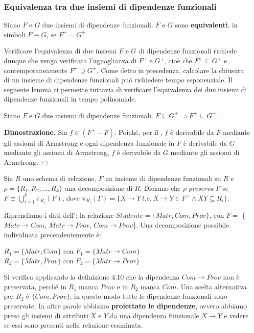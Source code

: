 \subsubsection{Equivalenza tra due insiemi di dipendenze funzionali}
\begin{defn}
Siano $F$ e $G$ due insiemi di dipendenze funzionali. $F$ e $G$ sono \textbf{equivalenti}, in simboli $F \equiv 
G$, se $F^+ = G^+$.
\end{defn}
Verificare l'equivalenza di due insiemi $F$ e $G$ di dipendenze funzionali richiede dunque che venga verificata
l'uguaglianza di $F^+$ e $G^+$, cioè che $F^+ \subseteq G^+$ e contemporaneamente $F^+ \supseteq G^+$. Come 
detto in precedenza, calcolare la chiusura di un insieme di dipendenze funzionali può richiedere tempo 
esponenziale. Il seguente lemma ci permette tuttavia di verificare l'equivalenza dei due insiemi di dipendenze
funzionali in tempo polinomiale.
\label{lemma4_2}
\begin{lem}
Siano $F$ e $G$ due insiemi di dipendenze funzionali. $F \subseteq G^+ \Rightarrow F^+ \subseteq G^+$. 
\end{lem}
\textbf{Dimostrazione.} Sia $f \in (F^+ -F)$. Poiché, per il , $f$ è derivabile
da $F$ mediante gli assiomi di Armstrong e ogni dipendenza funzionale in $F$ è derivabile da $G$ mediante gli 
assiomi di Armstrong, $f$ è derivabile da $G$ mediante gli assiomi di Armstrong. \hfill $\Box$

\begin{defn}
Sia $R$ uno schema di relazione, $F$ un insieme di dipendenze funzionali su $R$ e $\rho = \{R_1, R_2, \ldots,
R_k\}$ una decomposizione di $R$. Diciamo che $\rho$ \emph{preserva} $F$ se $F \equiv \bigcup_{i=1}^k 
\pi_{R_i}(F)$, dove $\pi_{R_i}(F) = \{X \rightarrow Y\ t.c.\ X \rightarrow Y \in F^+ \wedge XY \subseteq R_i\}$.
\end{defn}

\begin{exmp}
 Riprendiamo i dati dell': la relazione $Studente = \{Matr, Com, Prov\}$,
 con $F = $ \{$Matr\rightarrow Com$, $Matr\rightarrow Prov$, $Com\rightarrow Prov$\}. Una decomposizione possibile
 individuata precendentemente è:
  \begin{center}
    $R_1 = \{Matr, Com\}$ con $F_1 = \{Matr\rightarrow Com\}$ \\
    $R_2 = \{Matr, Prov\}$ con $F_2 = \{Matr\rightarrow Prov\}$ \\
   \end{center}
 Si verifica applicando la definizione 4.10 che la dipendenza $Com \rightarrow Prov$ non è preservata, 
 perché in $R_1$ manca $Prov$ e in $R_2$ manca $Com$. Una scelta alternativa per $R_2$ è
 $\{Com, Prov\}$; in questo modo tutte le dipendenze funzionali sono preservate. In altre parole abbiamo
 \textbf{proiettato le dipendenze}, ovvero abbiamo preso gli insiemi di attributi $X$ e $Y$ da una dipendenza funzionale
 $X \rightarrow Y$ e vedere se essi sono presenti nella relazione esaminata.
\end{exmp}



